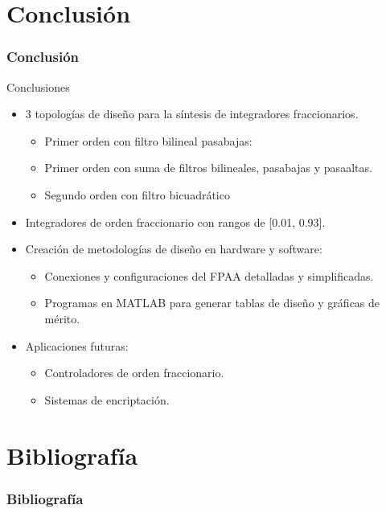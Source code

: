 \documentclass[10pt]{beamer}
\begin{document}
	\section{Conclusión}
	\begin{frame}
		\frametitle{Conclusión}
		\begin{block}{Conclusiones}
			\begin{itemize}
				\item 3 topologías de diseño para la síntesis de integradores fraccionarios.
					\begin{itemize}
						\item Primer orden con filtro bilineal pasabajas:
						\item Primer orden con suma de filtros bilineales, pasabajas y pasaaltas.
						\item Segundo orden con filtro bicuadrático
					\end{itemize}
				\item Integradores de orden fraccionario con rangos de [0.01, 0.93].
				
				\item Creación de metodologías de diseño en hardware y software:
				\begin{itemize}
					\item Conexiones y configuraciones del FPAA detalladas y simplificadas.
					\item Programas en MATLAB para generar tablas de diseño y gráficas de mérito.
				\end{itemize}
				\item Aplicaciones futuras:
					\begin{itemize}
						\item Controladores de orden fraccionario.
						\item Sistemas de encriptación.
					\end{itemize}
			\end{itemize}
		\end{block}
	\end{frame}	
	
	
	
	
	
	
	
	
	
	\section{Bibliografía}
	\begin{frame}[t, allowframebreaks]
		\frametitle{Bibliografía}
		\nocite{*}
		
		
	\end{frame}
	
\end{document}
